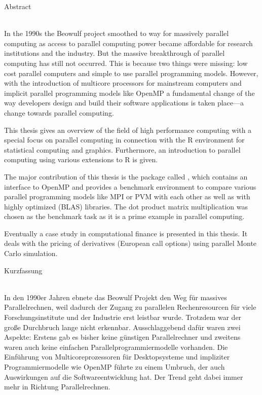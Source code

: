 \begin{center}
  {\Large Abstract\\}
  {\Large{\bf \Title}\\}
\end{center}
\bigskip

In the 1990s the Beowulf project smoothed to way for massively parallel
computing as access to parallel computing power became affordable for
research institutions and the industry. But the massive breakthrough
of parallel computing has still not occurred. This is because two
things were missing: low cost parallel computers and simple to use
parallel programming models. However, with the introduction of
multicore processors for mainstream computers and implicit parallel
programming models like OpenMP a fundamental change of the way
developers design and build their software applications is taken
place---a change towards parallel computing.

This thesis gives an overview of the field of high performance
computing with a special focus on parallel computing in connection
with the R environment for statistical computing and
graphics. Furthermore, an introduction to parallel computing using
various extensions to R is given.

The major contribution of this thesis is the package called
, which contains an interface to OpenMP and provides a
benchmark environment to compare various parallel programming models like
MPI or PVM with each other as well as with highly optimized (BLAS)
libraries. The dot product matrix multiplication was chosen as the
benchmark task as it is a prime example in parallel computing. 

Eventually a case study in computational finance is presented in this
thesis. It deals with the pricing of derivatives (European call
options) using parallel Monte Carlo simulation. 

\begin{center}
  {\Large Kurzfassung\\}
  {\Large{\bf \Titel}\\}
\end{center}
\bigskip

In den 1990er Jahren ebnete das Beowulf Projekt den Weg f\"ur massives
Parallelrechnen, weil dadurch der Zugang zu parallelen Rechenresourcen f\"ur
viele 
Forschungsinstitute und der Industrie erst leistbar wurde. Trotzdem
war der gro\ss{}e Durchbruch lange nicht erkennbar. Ausschlaggebend
daf\"ur waren zwei Aspekte:
Erstens gab es bisher keine g\"unstigen Parallelrechner und zweitens
waren auch keine einfachen Parallelprogrammiermodelle vorhanden. Die
Einf\"uhrung von Multicoreprozessoren f\"ur Desktopsysteme und
impliziter Programmiermodelle wie OpenMP f\"uhrte zu einem Umbruch,
der auch Auswirkungen auf die Softwareentwicklung hat. Der Trend geht
dabei immer mehr in Richtung Parallelrechnen.

